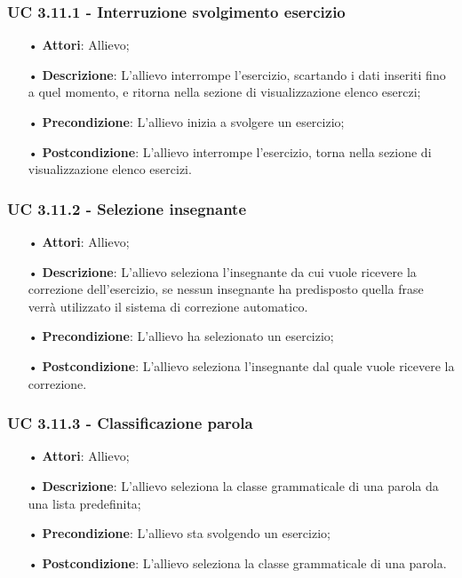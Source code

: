 \subsubsection{UC 3.11.1 - Interruzione svolgimento esercizio}
\begin{itemize}
	\item[•]\textbf{Attori}: Allievo;
	\item[•]\textbf{Descrizione}: L'allievo interrompe  l'esercizio, scartando i dati inseriti fino a quel momento, e ritorna nella sezione di visualizzazione elenco eserczi;
	\item[•]\textbf{Precondizione}: L'allievo inizia a svolgere un esercizio;
	\item[•]\textbf{Postcondizione}: L'allievo interrompe l'esercizio, torna nella sezione di visualizzazione elenco esercizi.
\end{itemize}

\subsubsection{UC 3.11.2 - Selezione insegnante}
\begin{itemize}
	\item[•]\textbf{Attori}: Allievo;
	\item[•]\textbf{Descrizione}: L'allievo seleziona l'insegnante da cui vuole ricevere la correzione dell'esercizio, se nessun insegnante ha predisposto quella frase verrà utilizzato il sistema di correzione automatico. %
	\item[•]\textbf{Precondizione}: L'allievo ha selezionato un esercizio;
	\item[•]\textbf{Postcondizione}: L'allievo seleziona l'insegnante dal quale vuole ricevere la correzione.
\end{itemize}

\subsubsection{UC 3.11.3 - Classificazione parola}
\begin{itemize}
	\item[•]\textbf{Attori}: Allievo;
	\item[•]\textbf{Descrizione}: L'allievo seleziona la classe grammaticale di una parola da una lista predefinita;
	\item[•]\textbf{Precondizione}: L'allievo sta svolgendo un esercizio;
	\item[•]\textbf{Postcondizione}: L'allievo seleziona la classe grammaticale di una parola.
\end{itemize}


